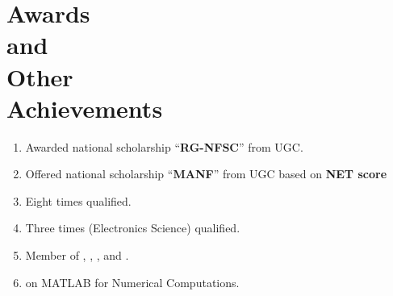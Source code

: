 \vspace{-2.5em}
\section{Awards\\and\\Other\\Achievements}
\vspace{-1em}
\begin{enumerate}[label={\textbf{\arabic*}.\ }]
\item Awarded national scholarship ``\textbf{RG-NFSC}'' from UGC.
\item Offered national scholarship ``\textbf{MANF}''  from UGC based on \textbf{NET score} 
\item Eight times  qualified. 
\item Three times  (Electronics Science) qualified. 
\item Member of , , , and .
\item {} on MATLAB for Numerical Computations.
\end{enumerate}
\vspace{-2em}
\sectionline